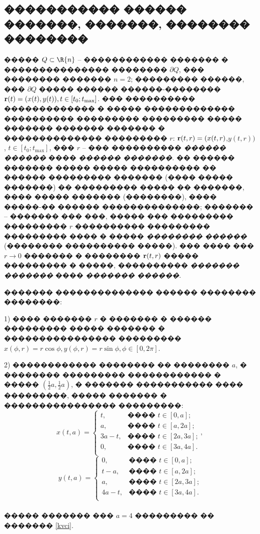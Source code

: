 \documentclass[a4paper]{article}
\begin{document}
\subsection{����������� ������ �������, �������, �������� ��������}
����� $Q \subset \R{n} $ -- ������������ ������� � ��������������� �������� $\partial Q$, ��� �������� ������� $n=2$;
��������� ������, ��� $\partial Q$ ����� ������ ������-�������� ${\bf r}(t)=(x(t),y(t)), t \in [t_0;t_{\max}]$.
��� ���������� ������������� � ����� ������������� ���������� ��������� ��������� ����� ������� ������� ������� � �������������� ��������� $r$: ${\bf r}(t,r)=(x(t,r)$,$y(t,r))$, $t \in [t_0;t_{\max}]$, ��� $r$ -- ��� ���������� {\it ������ ������} ���� {\it ������ �������}.
�� ������ ������� ����� ����� ���������� �� ������ ��������� ������� (���� ����� �������) �� ��������� ����� �� �������, ���� ����� ������� (��������), ���� �����-�� ������ ��������������;
������� -- ������� ��� ���, ����� ��� ��������� ��������� $r$ ���������� ��������� ��������� ���� � ����� {\it �������� ������} (�������� ���������� �����). ��� ���� ��� $r \rightarrow 0$ ������� � �������� ${\bf r}(t,r)$ ����� ��������� � �����, ���������� {\it ������� �������} ���� {\it ������� ������}.

������� �������������� ������ �������� ��������:

  1) ���� ������� $r$ � ������� � ������ ��������� ����� ������� � ���������������� ��������� $x(\phi, r)=r \cos \phi, y(\phi, r)=r \sin \phi, \phi \in [0, 2\pi]$.
  
  2) ������������ �������� �� �������� $a$, � �������� ��������� ������������ � ����� $(\frac{1}{2}a,\frac{1}{2}a)$, � ������� ����������� ���� ���������, ����� ������� � ���������������� ���������:
        \[
          x(t,a) =
          \begin{cases}
            t,    & \text{���� $t \in [0,a]$;}   \\
            a,    & \text{���� $t \in [a,2a]$;}  \\
            3a-t, & \text{���� $t \in [2a,3a]$;} \\
            0,    & \text{���� $t \in [3a,4a]$.} \\
          \end{cases},
        \]
        \[
          y(t,a) =
          \begin{cases}
            0,    & \text{���� $t \in [0,a]$;}   \\
            t-a,  & \text{���� $t \in [a,2a]$;}  \\
            a,    & \text{���� $t \in [2a,3a]$;} \\
            4a-t, & \text{���� $t \in [3a,4a]$.} \\
          \end{cases}
        \]
        \\
        ����� ������� ��� $a=4$ ��������� �� ������� \ref{kvci}.
\end{document}
